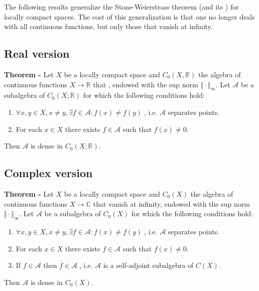 \documentclass[12pt]{article}
\begin{document}
The following results generalize the Stone-Weierstrass theorem (and its ) for locally compact spaces. The cost of this generalization is that one no longer deals with all continuous functions, but only those that vanish at infinity.

\subsection*{Real version}

{\bf Theorem -} Let $ X$ be a locally compact space and $C_0(X, \mathbb{R})$ the algebra of continuous functions $X \to \mathbb{R}$ that , endowed with the sup norm $\Vert \cdot \Vert _{\infty}$. Let $\mathcal{A}$ be a subalgebra of $C_0(X; \mathbb{R})$ for which the following conditions hold:

\begin{enumerate}
\item $\forall x, y \in X, x \ne y, \exists f \in \mathcal{A} : f(x) \neq f(y)\;$, i.e. $ \mathcal{A}$ separates points.
\item For each $x \in X$ there exists $f \in \mathcal{A}$ such that $f(x) \neq 0$.
\end{enumerate}

Then $\mathcal{A}$ is dense in $C_0(X; \mathbb{R})$.

\subsection*{Complex version}

{\bf Theorem -} Let $X$ be a locally compact space and $C_0(X)$ the algebra of continuous functions $X \to \mathbb{C}$ that vanish at infinity, endowed with the sup norm $\Vert \cdot \Vert _{\infty}$. Let $\mathcal{A}$ be a subalgebra of $C_0(X)$ for which the following conditions hold:

\begin{enumerate}
\item $\forall x, y \in X, x \ne y, \exists f \in \mathcal{A} : f(x) \neq f(y)\;$, i.e. $\mathcal{A}$ separates points.
\item For each $x \in X$ there exists $f \in \mathcal{A}$ such that $f(x) \neq 0$.
\item If $f \in \mathcal{A}$ then $\overline{f} \in \mathcal{A}\;$, i.e. $ \mathcal{A}$ is a self-adjoint subalgebra of $ C(X)$.
\end{enumerate}

Then $\mathcal{A}$ is dense in $C_0(X)$.

\end{document}
